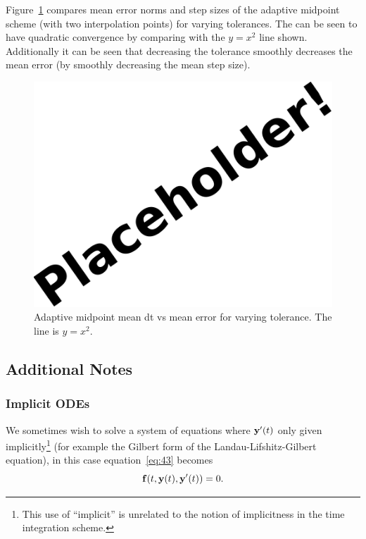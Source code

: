 Figure~\ref{fig:mp-tols} compares mean error norms and step sizes of the adaptive midpoint scheme (with two interpolation points) for varying tolerances.
The \imr can be seen to have quadratic convergence by comparing with the $y=x^2$ line shown.
Additionally it can be seen that decreasing the tolerance smoothly decreases the mean error (by smoothly decreasing the mean step size).

\begin{figure}[ht!]
  \centering
  \includegraphics{images/placeholder}
  \caption{Adaptive midpoint mean dt vs mean error for varying tolerance. The line is $y = x^2$.}
  \label{fig:mp-tols}
\end{figure}


\subsection{Additional Notes}

\subsubsection{Implicit ODEs}
\label{sec:extens-impl-odes}

We sometimes wish to solve a system of equations where $\mathbf{y}'(t)$ only given implicitly\footnote{This use of ``implicit'' is unrelated to the notion of implicitness in the time integration scheme.} (for example the Gilbert form of the Landau-Lifshitz-Gilbert equation), in this case equation~\eqref{eq:43} becomes
\begin{equation}
  {\mathbf{f}}(t, \mathbf{y}(t), \mathbf{y}'(t)) = 0.
\end{equation}

